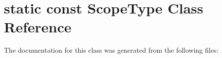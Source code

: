 \hypertarget{classstatic_01const_01ScopeType}{}\section{static const Scope\+Type Class Reference}
\label{classstatic_01const_01ScopeType}


The documentation for this class was generated from the following files\+: